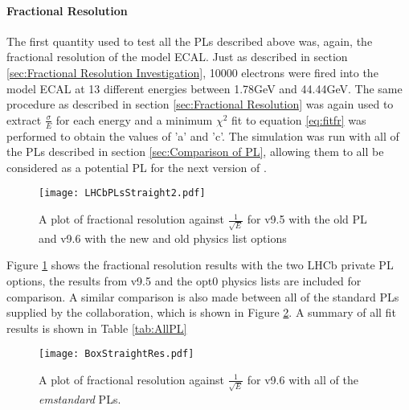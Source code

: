 \paragraph{Fractional Resolution}
The first quantity used to test all the PLs described above was, again, the fractional resolution of the model ECAL.  Just as described in section \ref{sec:Fractional Resolution Investigation}, 10000 electrons were fired into the model ECAL at 13 different energies between 1.78GeV and 44.44GeV.  The same procedure as described in section \ref{sec:Fractional Resolution} was again used to extract $\frac{\sigma}{E}$ for each energy and a minimum $\chi^2$ fit to equation \ref{eq:fitfr} was performed to obtain the values of 'a' and 'c'.  The simulation was run with all of the PLs described in section \ref{sec:Comparison of PL}, allowing them to all be considered as a potential PL for the next version of \gauss.
\begin{figure}[h]
  \centering
  \texttt{[image: LHCbPLsStraight2.pdf]}
  \caption{A plot of fractional resolution against $\frac{1}{\sqrt{E}}$ for \geant v9.5 with the old PL and v9.6 with the new and old physics list options}
  \label{fig:LHCbPLStraightFR}
\end{figure}

Figure \ref{fig:LHCbPLStraightFR} shows the fractional resolution results with the two LHCb private PL options, the results from v9.5 and the opt0 physics lists are included for comparison. A similar comparison is also made between all of the standard PLs supplied by the \geant collaboration, which is shown in Figure \ref{fig:BoxPLStraightFR}.  A summary of all fit results is shown in Table \ref{tab:AllPL}
\begin{figure}[h]
  \centering
  \texttt{[image: BoxStraightRes.pdf]}
  \caption{A plot of fractional resolution against $\frac{1}{\sqrt{E}}$ for \geant v9.6 with all of the \textit{emstandard} PLs.}
  \label{fig:BoxPLStraightFR}
\end{figure}

